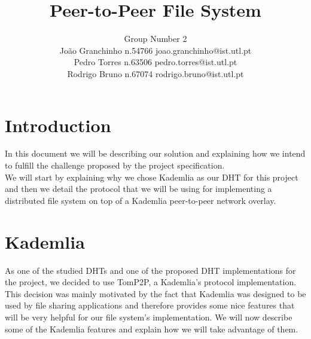 \documentclass[times,9pt,article]{llncs}
\begin{document}
\title{Peer-to-Peer File System}

\author{Group Number 2 \\
Jo\~ao Granchinho n.54766 joao.granchinho@ist.utl.pt \\
Pedro Torres  n.63506 pedro.torres@ist.utl.pt \\
Rodrigo Bruno n.67074 rodrigo.bruno@ist.utl.pt}
\maketitle


\section{Introduction}
In this document we will be describing our solution and explaining how we intend
to fulfill the challenge proposed by the project specification.\\
We will start by explaining why we chose Kademlia as our DHT for this project and
 then we detail the protocol that we will be using for implementing a distributed
file system on top of a Kademlia peer-to-peer network overlay.

\section{Kademlia}

As one of the studied DHTs and one of the proposed DHT implementations for the 
project, we decided to use TomP2P, a Kademlia's protocol implementation.\\
This decision was mainly motivated by the fact that Kademlia was designed to be
used by file sharing applications and therefore provides some nice features that
will be very helpful for our file system's implementation. We will now describe
 some of the Kademlia features and explain how we will take 
advantage of them. 
\end{document}
